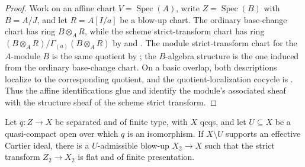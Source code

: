 \begin{proof}
  Work on an affine chart $V=\operatorname{Spec}(A)$, write
  $Z=\operatorname{Spec}(B)$ with $B=A/J$, and let
  $R=A[I/a]$ be a blow-up chart.  The ordinary base-change chart has ring
  $B\otimes_A R$, while the scheme strict-transform chart has ring
  $(B\otimes_A R)/\Gamma_{(a)}(B\otimes_A R)$ by
   and
  .  The
  module strict-transform chart for the $A$-module $B$ is the same quotient
  by ; the $B$-algebra
  structure is the one induced from the ordinary base-change chart.  On a
  basic overlap, both descriptions localize to the corresponding quotient,
  and the quotient-localization cocycle is
  .  Thus the affine
  identifications glue and identify the module's associated sheaf with the
  structure sheaf of the scheme strict transform.
\end{proof}

\begin{lemma}
  \label{lemma:nagata-flattening-after-cartier-boundary}

  Let $q\colon Z\to X$ be separated and of finite type, with $X$ qcqs, and
  let $U\subseteq X$ be a quasi-compact open over which $q$ is an
  isomorphism.  If $X\setminus U$ supports an effective
  Cartier ideal, there is a $U$-admissible blow-up $X_2\to X$ such that the
  strict transform $Z_2\to X_2$ is flat and of finite presentation.
\end{lemma}

